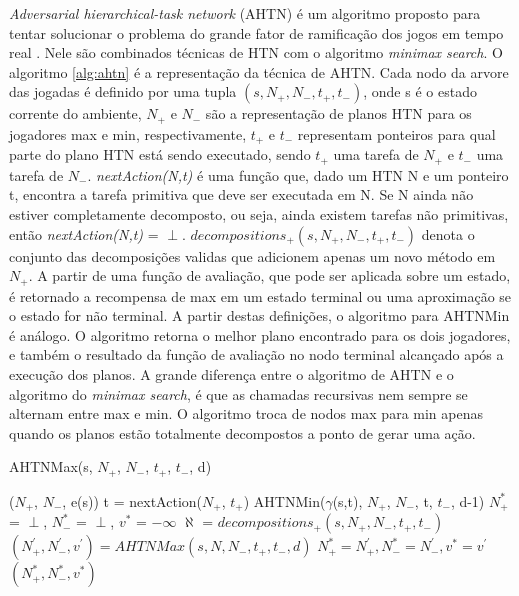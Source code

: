 \textit{Adversarial hierarchical-task network} (AHTN) é um algoritmo proposto para tentar solucionar o problema do grande fator de ramificação dos jogos em tempo real \cite{ontanon2015adversarial}. Nele são combinados técnicas de HTN com o algoritmo \textit{minimax search}. O algoritmo \ref{alg:ahtn} é a representação da técnica de AHTN. Cada nodo da arvore das jogadas é definido por uma tupla $(s, N_{+}, N_{-}, t_{+}, t_{-})$, onde s é o estado corrente do ambiente, $N_{+}$ e $N_{-}$ são a representação de planos HTN para os jogadores max e min, respectivamente, $t_{+}$ e $t_{-}$ representam ponteiros para qual parte do plano HTN está sendo executado, sendo  $t_{+}$ uma tarefa de $N_{+}$ e $t_{-}$ uma tarefa de $N_{-}$. \textit{nextAction(N,t)} é uma função que, dado um HTN N e um ponteiro t, encontra a tarefa primitiva que deve ser executada em N. Se N ainda não estiver completamente decomposto, ou seja, ainda existem tarefas não primitivas, então \textit{nextAction(N,t)} = $\perp$.  $decompositions_{+}(s, N_{+}, N_{-}, t_{+}, t_{-})$ denota o conjunto das decomposições validas que adicionem apenas um novo método em $N_{+}$. A partir de uma função de avaliação, que pode ser aplicada sobre um estado, é retornado a recompensa de max em um estado terminal ou uma aproximação se o estado for não terminal. A partir destas definições, o algoritmo para AHTNMin é análogo. O algoritmo retorna o melhor plano encontrado para os dois jogadores, e também o resultado da função de avaliação no nodo terminal alcançado após a execução dos planos. A grande diferença entre o algoritmo de AHTN e o algoritmo do \textit{minimax search}, é que as chamadas recursivas nem sempre se alternam entre max e min. O algoritmo troca de nodos max para min apenas quando os planos estão totalmente decompostos a ponto de gerar uma ação. 

\begin{algorithm}
	\caption{AHTNMax(s, $N_{+}$, $N_{-}$, $t_{+}$, $t_{-}$, d)}
	\label{alg:ahtn}
	\begin{algorithmic}[1]
		\State	\Return ($N_{+}$, $N_{-}$, e(s))
		\EndIf
		\State t = nextAction($N_{+}$, $t_{+}$) 
		\State \Return AHTNMin($\gamma$(s,t), $N_{+}$, $N_{-}$, t, $t_{-}$, d-1)
		\EndIf
		\State $N_{+}^{*}$ = $\perp$, $N_{-}^{*}$ = $\perp$, $v^{*}$ = $-\infty$
		\State $\aleph$ = $decompositions_{+}(s, N_{+}, N_{-}, t_{+}, t_{-})$
		\State $(N^{'}_{+}, N^{'}_{-}, v^{'}) = AHTNMax(s, N, N_{-}, t_{+}, t_{-}, d)$
		\State $N_{+}^{*} = N^{'}_{+}, N_{-}^{*} = N^{'}_{-}, v^{*} = v^{'} $
		\EndIf
		\EndFor		
		\State \Return $(N_{+}^{*}, N_{-}^{*}, v^{*} )$
	\end{algorithmic}
\end{algorithm}



